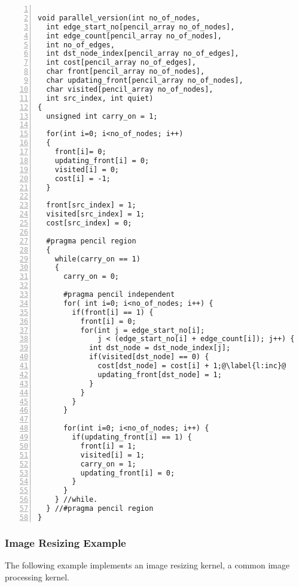 \begin{lstlisting}[language=pencil,escapechar=@, numbers=left,numberstyle={\tiny\tt},numbersep=5pt]

void parallel_version(int no_of_nodes,
  int edge_start_no[pencil_array no_of_nodes],
  int edge_count[pencil_array no_of_nodes],
  int no_of_edges,
  int dst_node_index[pencil_array no_of_edges],
  int cost[pencil_array no_of_edges],
  char front[pencil_array no_of_nodes],
  char updating_front[pencil_array no_of_nodes],
  char visited[pencil_array no_of_nodes],
  int src_index, int quiet)
{
  unsigned int carry_on = 1;

  for(int i=0; i<no_of_nodes; i++)
  {
    front[i]= 0;
    updating_front[i] = 0;
    visited[i] = 0;
    cost[i] = -1;
  }

  front[src_index] = 1;
  visited[src_index] = 1;
  cost[src_index] = 0;

  #pragma pencil region
  {
    while(carry_on == 1)
    {
      carry_on = 0;

      #pragma pencil independent
      for( int i=0; i<no_of_nodes; i++) {
        if(front[i] == 1) {
          front[i] = 0; 
          for(int j = edge_start_no[i]; 
              j < (edge_start_no[i] + edge_count[i]); j++) {
            int dst_node = dst_node_index[j];
            if(visited[dst_node] == 0) {
              cost[dst_node] = cost[i] + 1;@\label{l:inc}@
              updating_front[dst_node] = 1;
            }
          }
        }
      }

      for(int i=0; i<no_of_nodes; i++) {
        if(updating_front[i] == 1) {
          front[i] = 1;
          visited[i] = 1;
          carry_on = 1;
          updating_front[i] = 0;
        }
      }  
    } //while.
  } //#pragma pencil region
}
\end{lstlisting}

\subsubsection{Image Resizing Example}

The following example implements an image resizing kernel,
a common image processing kernel.

